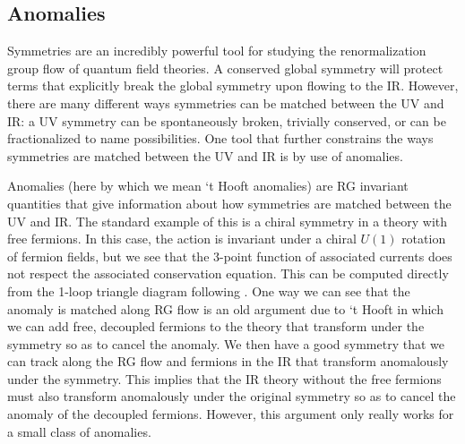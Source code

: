 \documentclass[11pt]{article}
\begin{document}
\subsection{Anomalies}
\label{sec:anomalies}
Symmetries are an incredibly powerful tool for studying the renormalization group flow of quantum field theories. A conserved global symmetry will protect terms that explicitly break the global symmetry upon flowing to the IR. However, there are many different ways symmetries can be matched between the UV and IR: a UV symmetry can be spontaneously broken, trivially conserved, or can be fractionalized to name possibilities.  One tool that further constrains the ways symmetries are matched between the UV and IR is by use of anomalies. 

Anomalies (here by which we mean `t Hooft anomalies) are RG invariant quantities that give information about how symmetries are matched between the UV and IR.   The standard example of this is a chiral symmetry in a theory with free fermions. In this case, the action is invariant under a chiral $U(1)$ rotation of fermion fields, but we see that the 3-point function of associated currents does not respect the associated conservation equation. This can be computed directly from the 1-loop triangle diagram following \cite{Adler:1969gk,Bell:1969ts,Fujikawa:1983bg}. One way we can see that the anomaly is matched along RG flow is an old argument due to `t Hooft in which we can add free, decoupled fermions to the theory that transform under the symmetry so as to cancel the anomaly. We then have a good symmetry that we can track along the RG flow and fermions in the IR that transform anomalously under the symmetry. This implies that the IR theory without the free fermions must also transform anomalously under the original symmetry so as to cancel the anomaly of the decoupled fermions. 
However, this argument only really works for a small class of anomalies. 
\end{document}
